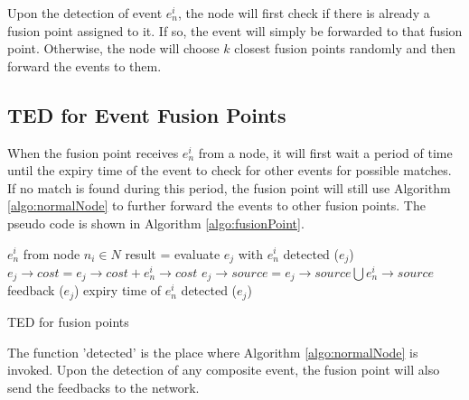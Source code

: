 Upon the detection of event \(e^i_n\), the node will first check if there is already a fusion point assigned to it. If so, the event will simply be forwarded to that fusion point. Otherwise, the node will choose \(k\) closest fusion points randomly and then forward the events to them.

\subsection{TED for Event Fusion Points}
When the fusion point receives \(e^i_n\) from a node, it will first wait a period of time until the expiry time of the event to check for other events for possible matches. If no match is found during this period, the fusion point will still use Algorithm \ref{algo:normalNode} to further forward the events to other fusion points. The pseudo code is shown in Algorithm \ref{algo:fusionPoint}.

\begin{algorithm}
\begin{algorithmic}[1]
\REQUIRE \(e^i_n\) from node \(n_i\in N\)
			\STATE result = evaluate \(e_j\) with \(e^i_n\)
				\STATE detected (\(e_j\))
				\STATE \(e_j\rightarrow cost=e_j\rightarrow cost+e^i_n\rightarrow cost\)
				\STATE \(e_j\rightarrow source=e_j\rightarrow source\bigcup e^i_n\rightarrow source\)
				\STATE feedback (\(e_j\))
			\ENDIF
		\ENDIF
	\ENDFOR
\REQUIRE expiry time of \(e^i_n\)
	\STATE detected (\(e_j\))
\end{algorithmic}
\caption{TED for fusion points}
\label{algo:fusionPoint}
\end{algorithm}

The function 'detected' is the place where Algorithm \ref{algo:normalNode} is invoked. Upon the detection of any composite event, the fusion point will also send the feedbacks to the network.

